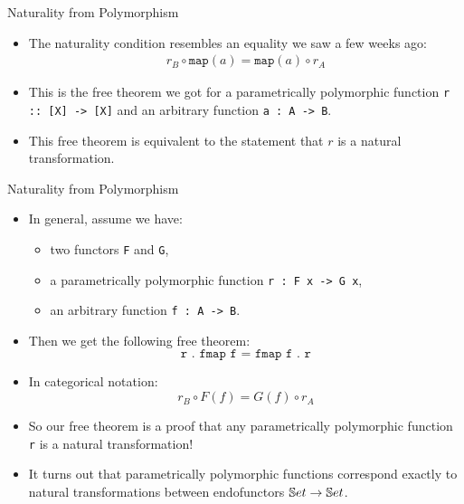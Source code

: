 \begin{frame}{Naturality from Polymorphism}
	\begin{itemize}
		\item The naturality condition resembles an equality we saw a few weeks ago:
		\begin{align*}
			r_B \circ \texttt{map}(a) = \texttt{map}(a) \circ r_A
		\end{align*}
		\pause \item This is the free theorem we got for a parametrically polymorphic function \texttt{r :: [X] -> [X]} and an arbitrary function \texttt{a : A -> B}.
		\pause \item This free theorem is equivalent to the statement that $r$ is a natural transformation.
	\end{itemize}
\end{frame}
\begin{frame}{Naturality from Polymorphism}
    \begin{itemize}
      \item In general, assume we have:
      \begin{itemize}
        \pause\item two functors \texttt{F} and \texttt{G},
        \pause\item a parametrically polymorphic function \texttt{r : F x -> G x},
        \pause\item an arbitrary function \texttt{f : A -> B}.
      \end{itemize}
      \pause\item Then we get the following free theorem:
      \begin{equation*}
       \texttt{r . fmap f = fmap f . r}
      \end{equation*}
      \vspace{-18pt}
      \pause\item In categorical notation:
      \begin{equation*}
        r_B \circ F(f) = G(f) \circ r_A
      \end{equation*}
      \vspace{-18pt}
      \pause\item So our free theorem is a proof that any parametrically polymorphic function \texttt{r} is a natural transformation!
      \pause\item It turns out that parametrically polymorphic functions correspond exactly to natural transformations between endofunctors $\mathbb{S} et \to \mathbb{S} et$.
    \end{itemize}
\end{frame}
